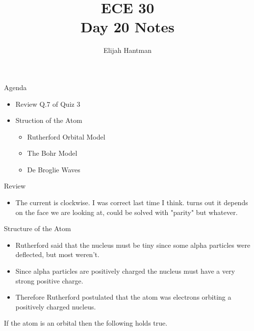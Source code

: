 \documentclass{report}
\title{\Huge{ECE 30}\\Day 20 Notes}
\author{\huge{Elijah Hantman}}
\date{}
\begin{document}
\maketitle
\newpage

\begin{description}
    \item {\large Agenda} 
        \begin{itemize}
            \item Review Q.7 of Quiz 3
            \item Struction of the Atom
                \begin{itemize}
                    \item Rutherford Orbital Model
                    \item The Bohr Model
                    \item De Broglie Waves
                \end{itemize}
        \end{itemize}
    \item {\large Review}
        \begin{mdframed}
            \begin{itemize}
                \item The current is clockwise. I was correct last time I think.
                    turns out it depends on the face we are looking at,
                    could be solved with "parity" but whatever.
            \end{itemize}
        \end{mdframed}
    \item {\large Structure of the Atom}
        \begin{mdframed}
            \begin{itemize}
                \item Rutherford said that the nucleus must be tiny since
                    some alpha particles were deflected, but most
                    weren't.
                \item Since alpha particles are positively charged the nucleus
                    must have a very strong positive charge.
                \item Therefore Rutherford postulated that the atom
                    was electrons orbiting a positively charged nucleus.
            \end{itemize}

            If the atom is an orbital then the following holds true.


\end{mdframed}
\end{description}
\end{document}
